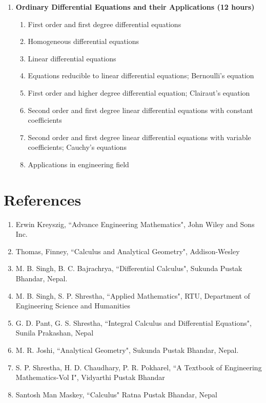 \begin{enumerate}
    \item \textbf{Ordinary Differential Equations and their Applications \hfill (12 hours)}
    \begin{enumerate}
        \item First order and first degree differential equations
        \item Homogeneous differential equations
        \item Linear differential equations
        \item Equations reducible to linear differential equations; Bernoulli's equation
        \item First order and higher degree differential equation; Clairaut's equation
        \item Second order and first degree linear differential equations with constant coefficients
        \item Second order and first degree linear differential equations with variable coefficients; Cauchy's equations
        \item Applications in engineering field
    \end{enumerate}
\end{enumerate}


\section*{References}
\begin{enumerate}
    \item Erwin Kreyszig, ``Advance Engineering Mathematics", John Wiley and Sons Inc.
    \item Thomas, Finney, ``Calculus and Analytical Geometry", Addison-Wesley
    \item M. B. Singh, B. C. Bajrachrya, ``Differential Calculus", Sukunda Pustak Bhandar, Nepal.
    \item M. B. Singh, S. P. Shrestha, ``Applied Mathematics", RTU,  Department of Engineering Science and Humanities
    \item G. D. Pant, G. S. Shrestha, ``Integral Calculus and Differential Equations", Sunila Prakashan, Nepal
    \item M. R. Joshi, ``Analytical Geometry", Sukunda Pustak Bhandar, Nepal.
    \item S. P. Shrestha, H. D. Chaudhary, P. R. Pokharel, ``A Textbook of Engineering Mathematics-Vol I", Vidyarthi Pustak Bhandar
    \item Santosh Man Maskey, ``Calculus" Ratna Pustak Bhandar, Nepal
\end{enumerate}
